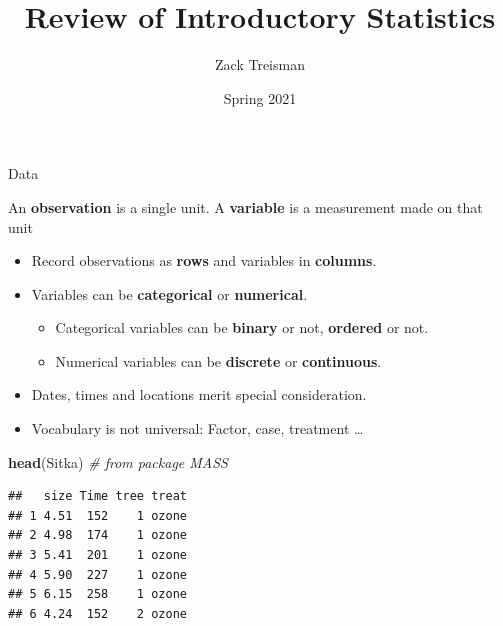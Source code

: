 \documentclass[
  ignorenonframetext,
]{beamer}
\title{Review of Introductory Statistics}
\author{Zack Treisman}
\date{Spring 2021}
\newenvironment{Shaded}{\begin{snugshade}}{\end{snugshade}}
\newcommand{\CommentTok}[1]{\textcolor[rgb]{0.56,0.35,0.01}{\textit{#1}}}
\newcommand{\KeywordTok}[1]{\textcolor[rgb]{0.13,0.29,0.53}{\textbf{#1}}}
\newcommand{\NormalTok}[1]{#1}
\providecommand{\tightlist}{%
  \setlength{\itemsep}{0pt}\setlength{\parskip}{0pt}}
\begin{document}
\frame{\titlepage}

\begin{frame}[fragile]{Data}
\protect\hypertarget{data}{}

An \textbf{observation} is a single unit. A \textbf{variable} is a
measurement made on that unit

\begin{itemize}
\tightlist
\item
  Record observations as \textbf{rows} and variables in
  \textbf{columns}.\\
\item
  Variables can be \textbf{categorical} or \textbf{numerical}.

  \begin{itemize}
  \tightlist
  \item
    Categorical variables can be \textbf{binary} or not,
    \textbf{ordered} or not.
  \item
    Numerical variables can be \textbf{discrete} or \textbf{continuous}.
  \end{itemize}
\item
  Dates, times and locations merit special consideration.
\item
  Vocabulary is not universal: Factor, case, treatment \ldots
\end{itemize}

\begin{Shaded}
\begin{Highlighting}[]
\KeywordTok{head}\NormalTok{(Sitka) }\CommentTok{# from package MASS}
\end{Highlighting}
\end{Shaded}

\begin{verbatim}
##   size Time tree treat
## 1 4.51  152    1 ozone
## 2 4.98  174    1 ozone
## 3 5.41  201    1 ozone
## 4 5.90  227    1 ozone
## 5 6.15  258    1 ozone
## 6 4.24  152    2 ozone
\end{verbatim}

\end{frame}
\end{document}
